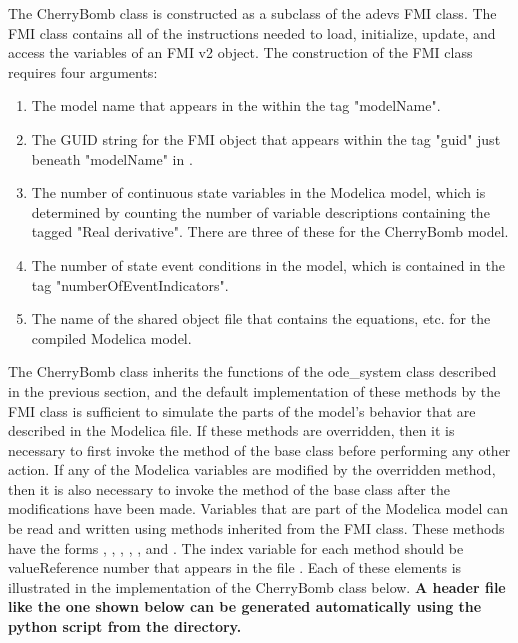 The CherryBomb class is constructed as a subclass of the adevs FMI class. The FMI class contains all of the instructions needed to load, initialize, update, and access the variables of an FMI v2 object. The construction of the FMI class requires four arguments:
\begin{enumerate}
\item The model name that appears in the  within the tag "modelName".
\item The GUID string for the FMI object that appears within the tag "guid" just beneath "modelName" in .
\item The number of continuous state variables in the Modelica model, which is determined by counting the number of variable descriptions containing the tagged "Real derivative". There are three of these for the CherryBomb model.
\item The number of state event conditions in the model, which is contained in the tag "numberOfEventIndicators".
\item The name of the shared object file that contains the equations, etc. for the compiled Modelica model.
\end{enumerate}
The CherryBomb class inherits the functions of the ode\_system class described in the previous section, and the default implementation of these methods by the FMI class is sufficient to simulate the parts of the model's behavior that are described in the Modelica file. If these methods are overridden, then it is necessary to first invoke the method of the base class before performing any other action. If any of the Modelica variables are modified by the overridden method, then it is also necessary to invoke the method of the base class after the modifications have been made. Variables that are part of the Modelica model can be read and written using methods inherited from the FMI class. These methods have the forms , , , , , and . The index variable for each method should be valueReference number that appears in the file . Each of these elements is illustrated in the implementation of the CherryBomb class below. \bf{A header file like the one shown below can be generated automatically using the  python script from the  directory.}

